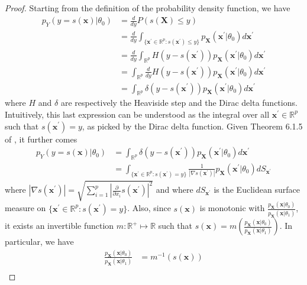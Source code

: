 \documentclass[12pt]{article}
\numberwithin{equation}{section}
\theoremstyle{plain}
\begin{document}
\begin{proof}
Starting from the definition of the probability density function, we have
\begin{align}
p_Y(y=s(\mathbf{x})|\theta_0) &= \frac{d}{dy} P(s(\mathbf{X}) \leq y) \nonumber \\
&= \frac{d}{dy}  \int_{\{\mathbf{x}^\prime \in \mathbb{R}^p : s(\mathbf{x}^\prime) \leq y\}} p_\mathbf{X}(\mathbf{x}^\prime|\theta_0) d\mathbf{x}^\prime \nonumber \\
&= \frac{d}{dy} \int_{\mathbb{R}^p} H(y - s(\mathbf{x}^\prime)) p_\mathbf{X}(\mathbf{x}^\prime|\theta_0) d\mathbf{x}^\prime \nonumber \\
&= \int_{\mathbb{R}^p} \frac{d}{dy} H(y - s(\mathbf{x}^\prime)) p_\mathbf{X}(\mathbf{x}^\prime|\theta_0) d\mathbf{x}^\prime \nonumber \\
&= \int_{\mathbb{R}^p} \delta(y - s(\mathbf{x}^\prime)) p_\mathbf{X}(\mathbf{x}^\prime|\theta_0) d\mathbf{x}^\prime
\end{align}
where $H$ and $\delta$ are respectively the Heaviside step and the Dirac delta
functions. Intuitively, this last expression can be understood as the integral
over all $\mathbf{x}^\prime \in \mathbb{R}^p$ such that $s(\mathbf{x}^\prime) = y$, as picked
by the Dirac delta function. Given Theorem 6.1.5 of \citet{Hrmander1990},
it further comes
\begin{align}
p_Y(y=s(\mathbf{x})|\theta_0) &= \int_{\mathbb{R}^p} \delta(y - s(\mathbf{x}^\prime)) p_\mathbf{X}(\mathbf{x}^\prime|\theta_0) d\mathbf{x}^\prime \nonumber \\
&= \int_{\{\mathbf{x}^\prime \in \mathbb{R}^p : s(\mathbf{x}^\prime) = y\}} \frac{1}{|\nabla s(\mathbf{x}^\prime)|} p_\mathbf{X}(\mathbf{x}^\prime|\theta_0) dS_{\mathbf{x}^\prime} \label{eqn:hormander}
\end{align}
where $|\nabla s(\mathbf{x}^\prime)| = \sqrt{\sum_{i=1}^p |\frac{\partial}{\partial x_i} s(\mathbf{x}^\prime)|^2}$
and where $dS_{\mathbf{x}^\prime}$ is the Euclidean surface measure on $\{\mathbf{x}^\prime \in \mathbb{R}^p : s(\mathbf{x}^\prime) = y\}$.
Also, since $s(\mathbf{x})$ is monotonic with
$\frac{p_\mathbf{X}(\mathbf{x}|\theta_0)}{p_\mathbf{X}(\mathbf{x}|\theta_1)}$,
it exists an invertible function $m:\mathbb{R}^+ \mapsto \mathbb{R}$ such
that $s(\mathbf{x}) = m(\frac{p_\mathbf{X}(\mathbf{x}|\theta_0)}{p_\mathbf{X}(\mathbf{x}|\theta_1)})$.
In particular, we have
\begin{align}
\frac{p_\mathbf{X}(\mathbf{x}|\theta_0)}{p_\mathbf{X}(\mathbf{x}|\theta_1)} &= m^{-1}(s(\mathbf{x})) \nonumber \\

\end{align}
\end{proof}
\end{document}
